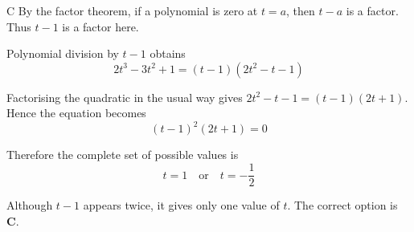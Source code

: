 \documentclass[11pt,a4paper]{article}
\begin{document}
\begin{enumerate}[label=\textbf{\arabic*.},leftmargin=*,itemsep=0pt,start=3]
\begin{djsSolution}{C}
By the factor theorem, if a polynomial is zero at $t=a$, then $t-a$ is a factor. Thus $t-1$ is a factor here. 

Polynomial division by $t-1$ obtains
\[
2t^3-3t^2+1
=(t-1)(2t^2-t-1)
\]

Factorising the quadratic in the usual way gives $2t^2-t-1=(t-1)(2t+1)$. Hence the equation becomes
\[
(t-1)^2(2t+1)=0
\]

Therefore the complete set of possible values is
\[
t=1\quad\text{or}\quad t=-\frac12
\]

Although $t-1$ appears twice, it gives only one value of $t$. The correct option is \textbf{C}.
\end{djsSolution}
\end{enumerate}
\clearpage
\thispagestyle{djssolutions}
\vspace*{8pt}
\end{document}
